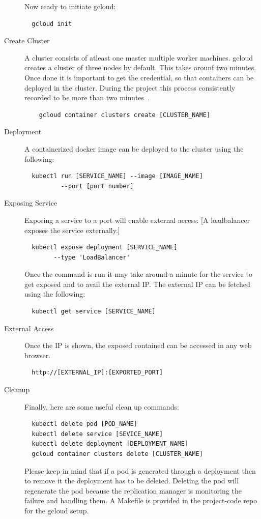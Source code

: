 \begin{description}
Now ready to initiate gcloud:
\begin{verbatim}
  gcloud init
\end{verbatim}

\item[Create Cluster] A cluster consists of atleast one master multiple worker
machines. gcloud creates a cluster of three nodes by default. This takes
arounf two minutes. Once done it is important to get the credential, so that
containers can be deployed in the cluster. During the project this process
consistently recorded to be more than two
minutes~\cite{hid-sp18-417-cluster-creation-video}.

  \begin{verbatim}
    gcloud container clusters create [CLUSTER_NAME]
  \end{verbatim}
\item[Deployment] A containerized docker image can be deployed to the cluster
using the following:
\begin{verbatim}
  kubectl run [SERVICE_NAME] --image [IMAGE_NAME] 
          --port [port number]
\end{verbatim}
\item [Exposing Service] Exposing a service to a port will enable external
access: [A loadbalancer exposes the service externally.]
\begin{verbatim}
  kubectl expose deployment [SERVICE_NAME] 
        --type 'LoadBalancer'
\end{verbatim}

Once the command is run it may take around a minute for the service to get
exposed and to avail the external IP. The external IP can be fetched using the
following:

\begin{verbatim}
  kubectl get service [SERVICE_NAME]
\end{verbatim}

\item [External Access] Once the IP is shown, the exposed contained can be
accessed in any web browser.
\begin{verbatim}
  http://[EXTERNAL_IP]:[EXPORTED_PORT]
\end{verbatim}

\item [Cleanup] Finally, here are some useful clean up commands:
\begin{verbatim}
  kubectl delete pod [POD_NAME]
  kubectl delete service [SEVICE_NAME]
  kubectl delete deployment [DEPLOYMENT_NAME]
  gcloud container clusters delete [CLUSTER_NAME]
\end{verbatim}

  Please keep in mind that if a pod is generated through a deployment then to
  remove it the deployment has to be deleted. Deleting the pod will regenerate
  the pod because the replication manager is monitoring the failure and
  handling them. A Makefile is provided in the project-code repo for the
  gcloud setup.

\end{description}


